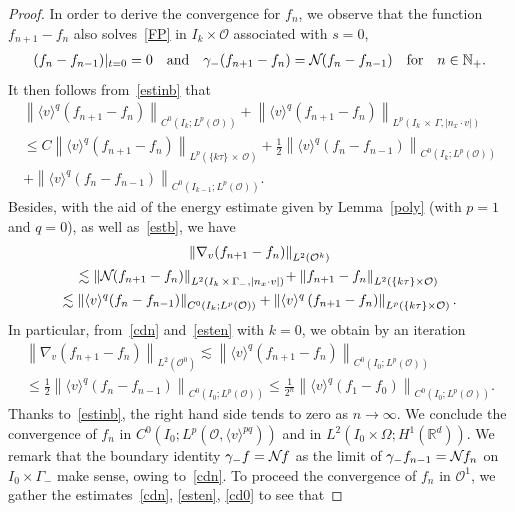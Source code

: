 \documentclass[10pt]{amsart}
\theoremstyle{definition}\newtheorem{defi}[theo]{Definition}\newtheorem{rema}[theo]{Remark}\newtheorem{exam}[theo]{Example}\newtheorem{exem}[theo]{Example}\newtheorem{nota}[theo]{Notation}
\newcommand*\N {\mathbb{N}}
\newcommand*\R {\mathbb{R}}
\newcommand*\NN {{\mathcal{N}\hspace{-.3mm}}}
\newcommand*\OO {\mathcal{O}}
\newcommand{\lv}{\langle v\rangle}
\begin{document}
\begin{proof}
In order to derive the convergence for $f_n$, we observe that the function $f_{n+1}-f_n$ also solves~\eqref{FP} in $I_k\times\OO$ associated with $s=0$,
\begin{align*}
(f_{n}-f_{n-1})|_{t=0}=0 \quad\text{and}\quad
\gamma_-(f_{n+1}-f_n)=\NN (f_{n}-f_{n-1})\quad\text{for}\quad n\in\N_+.
\end{align*}
It then follows from~\eqref{estinb} that
\begin{multline}\label{cdn}
\left\|\lv^{q}\left(f_{n+1}-f_{n}\right)\right\|_{C^0\left(I_k;L^p(\OO)\right)} + \left\|\lv^q \left(f_{n+1}-f_{n}\right)\right\|_{L^p\left(I_k\,\times\,\Gamma,|n_x\cdot v|\right)}\\
\le C\left\|\lv^{q}\left(f_{n+1}-f_{n}\right)\right\|_{L^p\left(\{k\tau\}\,\times\,\OO\right)} +\frac{1}{2}\left\|\lv^{q} \left(f_{n}-f_{n-1}\right)\right\|_{C^0\left(I_k;L^p(\OO)\right)}\\
+ \left\|\lv^{q} \left(f_{n}-f_{n-1}\right)\right\|_{C^0\left(I_{k-1};L^p(\OO)\right)}.
\end{multline}
Besides, with the aid of the energy estimate given by Lemma~\ref{poly} (with $p=1$ and $q=0$), as well as~\eqref{estb}, we have
\begin{multline}\label{esten}
\left\|\nabla_v(f_{n+1}-f_{n})\right\|_{L^2\left(\OO^k\right)} \\
\!\lesssim \left\|\NN(f_{n+1}-f_{n})\right\|_{L^2\left(I_k\,\times\,\Gamma_-,|n_x\cdot v|\right)}\! +\left\|f_{n+1}-f_{n}\right\|_{L^2(\{k\tau\}\times\OO)}\\
\lesssim \left\|\lv^q(f_{n}-f_{n-1})\right\|_{C^0\left(I_k;L^p(\OO)\right)} +\left\|\lv^{q}\left(f_{n+1}-f_{n}\right)\right \|_{L^p\left(\{k\tau\}\times\OO\right)}.
\end{multline}
In particular, from~\eqref{cdn} and~\eqref{esten} with $k=0$, we obtain by an iteration
\begin{multline}\label{cd0}
\left\|\nabla_v(f_{n+1}-f_{n})\right\|_{L^2(\OO^0)}
\lesssim \left\|\lv^{q}(f_{n+1}-f_{n})\right\|_{C^0\left(I_0;L^p(\OO)\right)} \\
\le\frac{1}{2}\left\|\lv^{q} (f_{n}-f_{n-1})\right\|_{C^0\left(I_0;L^p(\OO)\right)}
\le\frac{1}{2^n}\left\|\lv^{q} (f_{1}-f_{0})\right\|_{C^0(I_0;L^p(\OO))}.
\end{multline}
Thanks to~\eqref{estinb}, the right hand side tends to zero as $n\rightarrow\infty$. We conclude the convergence of $f_n$ in $C^0(I_0;L^p(\OO,\lv^{pq}))$ and in $L^2(I_0\times\Omega;H^1(\R^d))$. We remark that the boundary identity $\gamma_-f=\NN f$ as the limit of $\gamma_-f_{n-1}=\NN f_n$ on $I_0\times\Gamma_-$ make sense, owing to~\eqref{cdn}. To proceed the convergence of $f_n$ in $\OO^1$, we gather the estimates~\eqref{cdn}, \eqref{esten}, \eqref{cd0} to see that

\end{proof}
\end{document}
